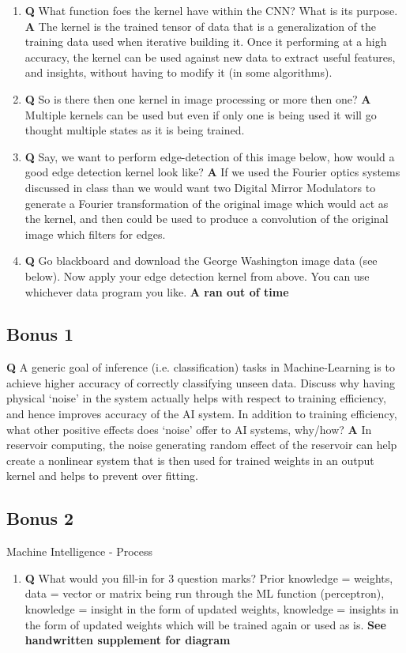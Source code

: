 \documentclass[main.tex]{subfiles}
\begin{document}
\begin{enumerate}
	\begin{enumerate}
	    \item \textbf{Q} What function foes the kernel have within the CNN? What is its purpose. \textbf{A} The kernel is the trained tensor of data that is a generalization of the training data used when iterative building it. Once it performing at a high accuracy, the kernel can be used against new data to extract useful features, and insights, without having to modify it (in some algorithms).
	    \item \textbf{Q} So is there then one kernel in image processing or more then one? \textbf{A} Multiple kernels can be used but even if only one is being used it will go thought multiple states as it is being trained.
	    \item \textbf{Q} Say, we want to perform edge-detection of this image below, how would a good edge detection kernel look like? \textbf{A} If we used the Fourier optics systems discussed in class than we would want two Digital Mirror Modulators to generate a Fourier transformation of the original image which would act as the kernel, and then could be used to produce a convolution of the original image which filters for edges.
	    \item \textbf{Q} Go blackboard and download the George Washington image data (see below). Now apply your edge detection kernel from above. You can use whichever data program you like. \textbf{A ran out of time} 
 	\end{enumerate}
\end{enumerate}

\subsection{Bonus 1} \textbf{Q} A generic goal of inference (i.e. classification) tasks in Machine-Learning is to achieve higher accuracy of correctly classifying unseen data. Discuss why having physical ‘noise’ in the system actually helps with respect to training efficiency, and hence improves accuracy of the AI system. In addition to training efficiency, what other positive effects does ‘noise’ offer to AI systems, why/how? \textbf{A} In reservoir computing, the noise generating random effect of the reservoir can help create a nonlinear system that is then used for trained weights in an output kernel and helps to prevent over fitting.

\subsection{Bonus 2} Machine Intelligence - Process
\begin{enumerate}
    \item \textbf{Q} What would you fill-in for 3 question marks?  Prior knowledge = weights, data = vector or matrix being run through the ML function (perceptron), knowledge = insight in the form of updated weights, knowledge = insights in the form of updated weights which will be trained again or used as is. \textbf{See handwritten supplement for diagram}
\end{enumerate}
\end{document}
